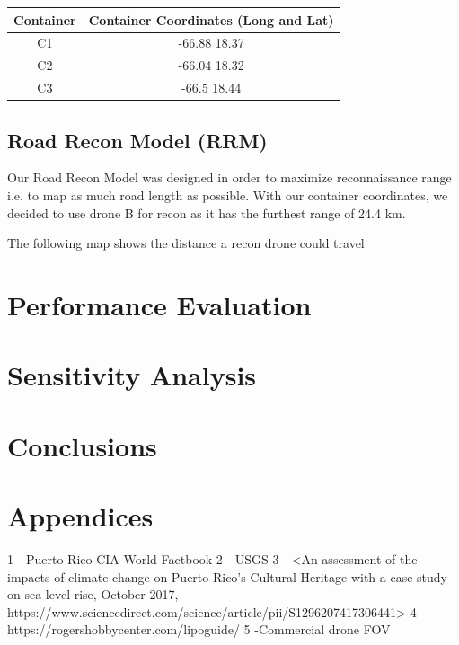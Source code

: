 \documentclass[a4paper,12pt]{article}
\begin{document}
\begin{center}
\begin{tabular}{ |c|c| }
 \hline
 Container & Container Coordinates (Long and Lat) \\\hline
  C1 & -66.88 18.37 \\
  C2 & -66.04 18.32  \\
  C3 & -66.5 18.44  \\
 \hline
\end{tabular}
\end{center}

\subsection{Road Recon Model (RRM)}
Our Road Recon Model was designed in order to maximize reconnaissance range i.e. to map as much road length as possible.
With our container coordinates, we decided to use drone B for recon as it has the furthest range of 24.4 km.

The following map shows the distance a recon drone could travel



\newpage

\section{Performance Evaluation}

\newpage

\section{Sensitivity Analysis}

\newpage

\section{Conclusions}

\newpage

\section{Appendices}
1 - Puerto Rico CIA World Factbook
2 - USGS
3 - <An assessment of the impacts of climate change on Puerto Rico's Cultural Heritage with a case study on sea-level rise, October 2017, https://www.sciencedirect.com/science/article/pii/S1296207417306441>
4- https://rogershobbycenter.com/lipoguide/
5 -Commercial drone FOV
\end{document}
